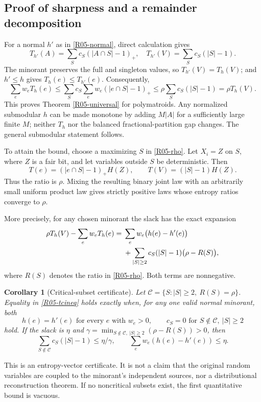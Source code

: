 \documentclass[11pt,a4paper]{article}
\newtheorem{corollary}[theorem]{Corollary}
\theoremstyle{definition}\newtheorem{definition}[theorem]{Definition}
\theoremstyle{remark}\newtheorem{remark}[theorem]{Remark}
\numberwithin{equation}{section}
\begin{document}
\subsection{Proof of sharpness and a remainder decomposition}\label{R05-sec-3}
For a normal $h'$ as in \eqref{R05-normal}, direct calculation gives
\[
T_{h'}(A)=\sum_S c_S(|A\cap S|-1)_+,
\quad
T_{h'}(V)=\sum_S c_S(|S|-1).
\]
The minorant preserves the full and singleton values, so $T_{h'}(V)=T_h(V)$; and $h'\leq h$ gives $T_h(e)\leq T_{h'}(e)$. Consequently,
\[
\sum_e w_eT_h(e)\leq\sum_S c_S\sum_e w_e(|e\cap S|-1)_+
\leq\rho\sum_Sc_S(|S|-1)=\rho T_h(V).
\]
This proves Theorem \ref{R05-universal} for polymatroids. Any normalized submodular $h$ can be made monotone by adding $M|A|$ for a sufficiently large finite $M$; neither $T_h$ nor the balanced fractional-partition gap changes. The general submodular statement follows.

To attain the bound, choose a maximizing $S$ in \eqref{R05-rho}. Let $X_i=Z$ on $S$, where $Z$ is a fair bit, and let variables outside $S$ be deterministic. Then
\[
T(e)=(|e\cap S|-1)_+H(Z),\qquad T(V)=(|S|-1)H(Z).
\]
Thus the ratio is $\rho$. Mixing the resulting binary joint law with an arbitrarily small uniform product law gives strictly positive laws whose entropy ratios converge to $\rho$.

More precisely, for any chosen minorant the slack has the exact expansion
\begin{align}\label{R05-remainder}
\rho T_h(V)-\sum_e w_eT_h(e)
={}&\sum_e w_e\bigl(h(e)-h'(e)\bigr)\\
&+\sum_{|S|\geq2}c_S(|S|-1)\bigl(\rho-R(S)\bigr),\notag
\end{align}
where $R(S)$ denotes the ratio in \eqref{R05-rho}. Both terms are nonnegative.

\begin{corollary}[Critical-subset certificate]\label{R05-critical}
Let $\mathcal C=\{S:|S|\geq2,\ R(S)=\rho\}$. Equality in \eqref{R05-tcineq} holds exactly when, for any one valid normal minorant, both
\[
h(e)=h'(e)\text{ for every }e\text{ with }w_e>0,
\qquad c_S=0\text{ for }S\notin\mathcal C,\ |S|\geq2
\]
hold. If the slack is $\eta$ and
$\gamma=\min_{S\notin\mathcal C,\ |S|\geq2}(\rho-R(S))>0$, then
\[
\sum_{S\notin\mathcal C}c_S(|S|-1)\leq\eta/\gamma,
\qquad\sum_e w_e(h(e)-h'(e))\leq\eta.
\]
\end{corollary}
This is an entropy-vector certificate. It is not a claim that the original random variables are coupled to the minorant's independent sources, nor a distributional reconstruction theorem. If no noncritical subsets exist, the first quantitative bound is vacuous.
\end{document}
